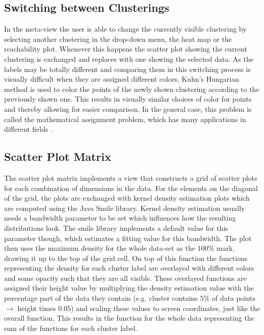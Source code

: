 \documentclass[
	a4paper,
	english,
	twoside,
	openright,               
	11pt                            
	]{report}
\begin{document}
\subsection{Switching between Clusterings}

In the meta-view the user is able to change the currently visible clustering by selecting another clustering in the drop-down menu, the heat map or the reachability plot. Whenever this happens the scatter plot showing the current clustering is exchanged and replaces with one showing the selected data. As the labels may be totally different and comparing them in this switching process is visually difficult when they are assigned different colors, Kuhn’s Hungarian method \cite{Kuhn2010} is used to color the points of the newly shown clustering according to the previously shown one. This results in visually similar choices of color for points and thereby allowing for easier comparison. In the general case, this problem is called the mathematical assignment problem, which has many applications in different fields \cite{Kuhn2010}.

\subsection{Scatter Plot Matrix}

The scatter plot matrix implements a view that constructs a grid of scatter plots for each combination of dimensions in the data. For the elements on the diagonal of the grid, the plots are exchanged with kernel density estimation plots which are computed using the Java Smile \cite{javasmile} library. Kernel density estimation usually needs a bandwidth parameter to be set which influences how the resulting distributions look. The smile library implements a default value for this parameter though, which estimates a fitting value for this bandwidth. The plot then uses the maximum density for the whole data-set as the $100\% $ mark, drawing it up to the top of the grid cell. On top of this function the functions representing the density for each cluster label are overlayed with different colors and some opacity such that they are all visible. These overlayed functions are assigned their height value by multiplying the density estimation value with the percentage part of the data they contain (e.g. cluster contains $5\% $ of data points $\rightarrow$ height times $0.05$) and scaling these values to screen coordinates, just like the overall function. This results in the function for the whole data representing the sum of the functions for each cluster label.
\end{document}
